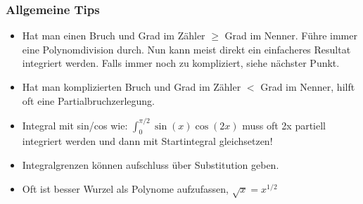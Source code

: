 \subsubsection{Allgemeine Tips}
\begin{itemize}[leftmargin=*]
	\item Hat man einen Bruch und Grad im Zähler $\geq$ Grad im Nenner. Führe immer eine Polynomdivision durch. Nun kann meist direkt ein einfacheres Resultat integriert werden. Falls immer noch zu kompliziert, siehe nächster Punkt.

	\item Hat man komplizierten Bruch und Grad im Zähler $<$ Grad im Nenner, hilft oft eine Partialbruchzerlegung.

	\item Integral mit sin/cos wie: $\int_0^{\pi/2} \sin(x) \cos(2x)$ muss oft 2x partiell integriert werden und dann mit Startintegral gleichsetzen!

	\item Integralgrenzen können aufschluss über Substitution geben.

	\item Oft ist besser Wurzel als Polynome aufzufassen, $\sqrt{x} = x^{1/2}$
\end{itemize}




